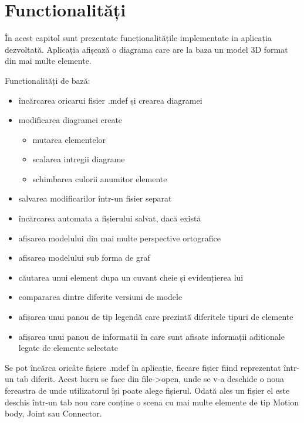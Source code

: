 \newpage
\section{Functionalități}

În acest capitol sunt prezentate funcționalitățile implementate in aplicația dezvoltată. Aplicația afișează o diagrama 
care are la baza un model 3D format din mai multe elemente.\newline

Functionalități de bază:
\begin{itemize}
    \item încărcarea oricarui fisier .mdef și crearea diagramei
    \item modificarea diagramei create
    \begin{itemize}
        \item mutarea elementelor
        \item scalarea intregii diagrame
        \item schimbarea culorii anumitor elemente
    \end{itemize} 
    \item salvarea modificarilor într-un fisier separat
    \item încărcarea automata a fișierului salvat, dacă există
    \item afisarea modelului din mai multe perspective ortografice
    \item afisarea modelului sub forma de graf
    \item căutarea unui element dupa un cuvant cheie și evidențierea lui
    \item compararea dintre diferite versiuni de modele
    \item afișarea unui panou de tip legendă care prezintă diferitele tipuri de elemente
    \item afișarea unui panou de informatii în care sunt afisate informații aditionale legate de elemente selectate
\end{itemize}

Se pot încărca oricâte fișiere .mdef în aplicație, fiecare fișier fiind reprezentat într-un tab diferit. 
Acest lucru se face din file->open, unde se v-a deschide o noua fereastra de unde utilizatorul își poate alege fișierul. 
Odată ales un fișier el este deschis într-un tab nou care conține o scena cu mai multe elemente de tip Motion body, 
Joint sau Connector.\newline

